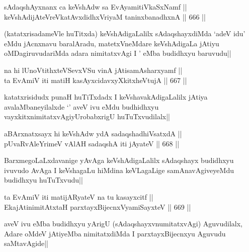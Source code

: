 
\begin{shl}
sAdaqshAyxnanx ca keVshAdw sa EvAyamitiVkaSxNamf || \\
keVshAdijAteVreVkatAvxdidhxVriyaM taninxbanadhxnA ||  666 ||  
\end{shl}

\begin{artha}
(katatxrisadameVle huTitxda) keVshAdigaLalilx sAdaqshayxdiMda `adeV idu' eMdu jAcnxnavu baralAradu, matetxVneMdare keVshAdigaLa jAtiyu oMDagiruvudariMda adara nimitatxvAgi I \stext' eMba budidhxyu baruvudu||
\end{artha}

\begin{shl}
na hi lUnoVtithxteVSevxVSu vinA jAtisamAsharxyamf || \\
ta EvAmiV iti matiH kasAyxcidavxyXkitxheVtujA ||  667 ||  
\end{shl}

\begin{artha}
katatxrisidudx punaH huTiTxdadx I keVshavakAdigaLalilx jAtiya avalaMbaneyilalxde `\stext' aveV ivu eMdu budhidhxyu vayxkitxnimitatxvAgiyUrobabxrigU huTuTxvudilalx||
\end{artha}

\begin{shl}
aBArxnatxsayx hi keVshAdw ydA sadaqshadhiVsatxdA || \\
pUvaRvAleYrimeV vAlAH sadaqshA iti jAyateV ||  668 ||  
\end{shl}

\begin{artha}
BarxmegoLaLxdavanige yAvAga keVshAdigaLalilx sAdaqshayx budidhxyu ivuvudo AvAga I keVshagaLu hiMdina keVLagaLige samAnavAgiveyeMdu budidhxyu huTuTxvudu||
\end{artha}


\begin{shl}
ta EvAmiV iti matijARyateV na tu kasayxcitf || \\
EkajAtinimitAtx\s taH parxtayxBijecnxVyamiSayxteV ||  669 || 
\end{shl}

\begin{artha}
aveV ivu eMba budidhxyu yArigU (sAdaqshayxvnumitatxvAgi) Aguvudilalx, Adare oMdeV jAtiyeMba nimitatxdiMda I parxtayxBijecnxyu Aguvudu saMtavAgide||
\end{artha}


